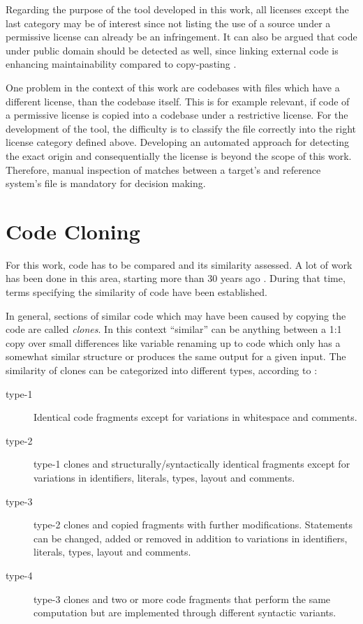 Regarding the purpose of the tool developed in this work, all licenses except the last category may be of interest since not listing the use of a source under a permissive license can already be an infringement.
It can also be argued that code under public domain should be detected as well, since linking external code is enhancing maintainability compared to copy-pasting \cite{heinemann2012effective}.

One problem in the context of this work are codebases with files which have a different license, than the codebase itself.
This is for example relevant, if code of a permissive license is copied into a codebase under a restrictive license.
For the development of the tool, the difficulty is to classify the file correctly into the right license category defined above.
Developing an automated approach for detecting the exact origin and consequentially the license is beyond the scope of this work.
Therefore, manual inspection of matches between a target's and reference system's file is mandatory for decision making.

\section{Code Cloning}\label{section:preliminaries/code_cloning}
For this work, code has to be compared and its similarity assessed.
A lot of work has been done in this area, starting more than 30 years ago \cite{lancaster2004comparison}.
During that time, terms specifying the similarity of code have been established.

In general, sections of similar code which may have been caused by copying the code are called \textit{clones}.
In this context ``similar'' can be anything between a 1:1 copy over small differences like variable renaming up to code which only has a somewhat similar structure or produces the same output for a given input.
The similarity of clones can be categorized into different types, according to \cite{roy2007survey}:

\begin{description}
	\item[type-1] Identical code fragments except for variations in whitespace and comments.
	\item[type-2] type-1 clones and structurally/syntactically identical fragments except for variations in identifiers, literals, types, layout and comments.
	\item[type-3] type-2 clones and copied fragments with further modifications. Statements can be changed, added or removed in addition to variations in identifiers, literals, types, layout and comments.
	\item[type-4] type-3 clones and two or more code fragments that perform the same computation but are implemented through different syntactic variants.
\end{description}


